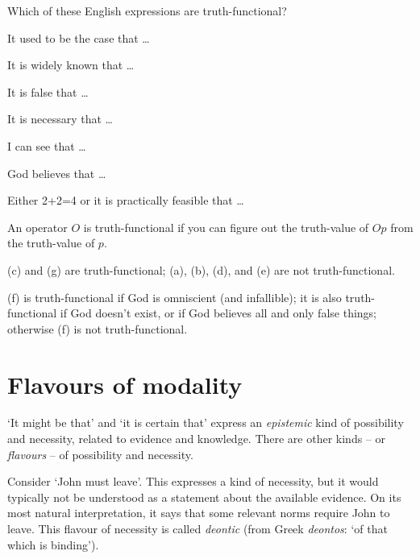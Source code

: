 \begin{exercise}\label{ex:truth-func}
  Which of these English expressions are truth-functional?
  \begin{exlist}
  \item It used to be the case that \ldots
  \item It is widely known that \ldots
  \item It is false that \ldots
  \item It is necessary that \ldots
  \item I can see that \ldots
  \item God believes that \ldots
  \item Either 2+2=4 or it is practically feasible that \ldots
  \end{exlist}
\end{exercise}
\begin{solution}
  An operator $O$ is truth-functional if you can figure out the
  truth-value of $Op$ from the truth-value of $p$.

  (c) and (g) are truth-functional; (a), (b), (d), and (e) are not
  truth-functional.

  (f) is truth-functional if God is omniscient (and infallible); it is also
  truth-functional if God doesn't exist, or if God believes all and only false
  things; otherwise (f) is not truth-functional.
\end{solution}

\section{Flavours of modality}
\label{sec:flavours}



`It might be that' and `it is certain that' express an \emph{epistemic} kind of
possibility and necessity, related to evidence and knowledge. There are other
kinds -- or \emph{flavours} -- of possibility and necessity.


Consider `John must leave'. This expresses a kind of necessity, but it would
typically not be understood as a statement about the available evidence. On its
most natural interpretation, it says that some relevant norms require John to
leave. This flavour of necessity is called \emph{deontic} (from Greek
\emph{deontos}: `of that which is binding').

